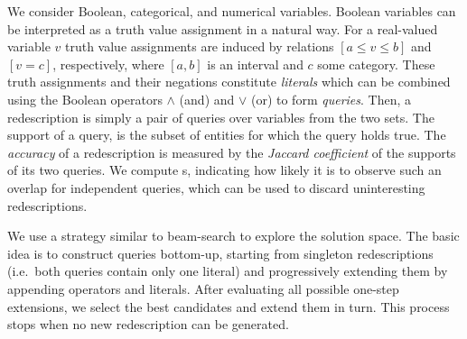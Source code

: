 \documentclass{sig-alternate}
\begin{document}
We consider Boolean, categorical, and numerical variables. Boolean
variables can be interpreted as a truth value assignment in a natural
way.  For a real-valued variable $v$ truth value assignments are
induced by relations $[a \leq v \leq b]$ and $[v=c]$, respectively,
where $[a, b]$ is an interval and $c$ some category.  These truth
assignments and their negations constitute \emph{literals} which can
be combined using the Boolean operators $\land$ (and) and $\lor$ (or)
to form \emph{queries}.  Then, a redescription is simply a pair of
queries over variables from the two sets.  The support of a query, is
the subset of entities for which the query holds true.  The
\emph{accuracy} of a redescription is measured by the \emph{Jaccard
  coefficient} of the supports of its two queries. We compute
\pValue{}s, indicating how likely it is to observe such an overlap for
independent queries, which can be used to discard uninteresting
redescriptions.

We use a strategy similar to beam-search to explore the
solution space.  The basic idea is to construct queries bottom-up,
starting from singleton redescriptions (i.e.\ both queries contain
only one literal) and progressively extending them by appending
operators and literals. %
After evaluating all
possible one-step extensions, we select the best candidates and extend
them in turn. This process stops when no new redescription can
be generated.

\end{document}
